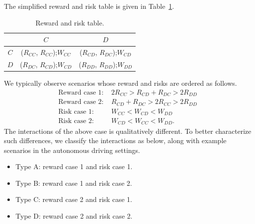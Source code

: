 \documentclass[letterpaper]{article} %
\newtheorem{definition}{Definition}
\begin{document}
The simplified reward and risk table is given in Table~\ref{tab:general_reward}.
\begin{table}[H]
    \centering
    \begin{tabular}{c|c|c}
         & $C$ & $D$ \\\hline
        $C$ & ($R_{CC}$, $R_{CC}$);$W_{CC}$ & ($R_{CD}$, $R_{DC}$);$W_{CD}$ \\
        $D$ & ($R_{DC}$, $R_{CD}$);$W_{CD}$ & ($R_{DD}$, $R_{DD}$);$W_{DD}$ 
    \end{tabular}
    \caption{Reward and risk table.} 
    \label{tab:general_reward}
\end{table}
We typically observe scenarios whose reward and risks are ordered as follows. 
\begin{align}
    \textrm{Reward case 1: }&2R_{CC}>R_{CD}+R_{DC}>2R_{DD} \label{eq:reward_case1}\\
    \textrm{Reward case 2: }&R_{CD}+R_{DC}>2R_{CC}>2R_{DD} \label{eq:reward_case2}\\
    \textrm{Risk case 1: }&W_{CC}<W_{CD}<W_{DD}\\
    \textrm{Risk case 2: }&W_{CD}<W_{CC}<W_{DD}.
\end{align}
The interactions of the above case is qualitatively different. To better characterize such differences, we classify the interactions as below, along with example scenarios in the autonomous driving settings.
\begin{itemize}
    \item Type A: reward case 1 and risk case 1.
    \item Type B: reward case 1 and risk case 2. 
    \item Type C: reward case 2 and risk case 1.
    \item Type D: reward case 2 and risk case 2.
\end{itemize}
\end{document}
